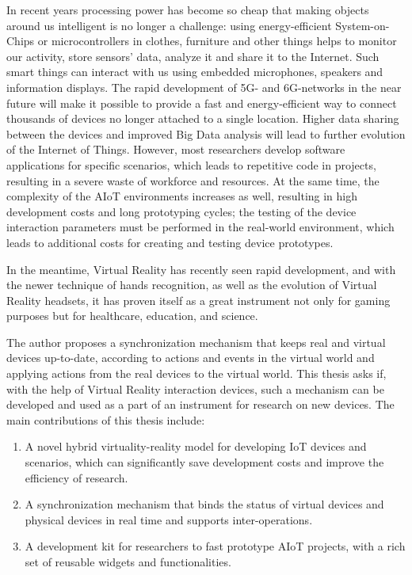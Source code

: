 \begin{abstract*}

  In recent years processing power has become so cheap that making objects around us intelligent is no longer a challenge: using energy-efficient System-on-Chips or microcontrollers in clothes, furniture and other things helps to monitor our activity, store sensors' data, analyze it and share it to the Internet. Such smart things can interact with us using embedded microphones, speakers and information displays. The rapid development of 5G- and 6G-networks in the near future will make it possible to provide a fast and energy-efficient way to connect thousands of devices no longer attached to a single location. Higher data sharing between the devices and improved Big Data analysis will lead to further evolution of the Internet of Things. However, most researchers develop software applications for specific scenarios, which leads to repetitive code in projects, resulting in a severe waste of workforce and resources. At the same time, the complexity of the AIoT environments increases as well, resulting in high development costs and long prototyping cycles; the testing of the device interaction parameters must be performed in the real-world environment, which leads to additional costs for creating and testing device prototypes.  
   
  In the meantime, Virtual Reality has recently seen rapid development, and with the newer technique of hands recognition, as well as the evolution of Virtual Reality headsets, it has proven itself as a great instrument not only for gaming purposes but for healthcare, education, and science.
   
  The author proposes a synchronization mechanism that keeps real and virtual devices up-to-date, according to actions and events in the virtual world and applying actions from the real devices to the virtual world. This thesis asks if, with the help of Virtual Reality interaction devices, such a mechanism can be developed and used as a part of an instrument for research on new devices. The main contributions of this thesis include:
  
  \begin{enumerate}
      \item A novel hybrid virtuality-reality model for developing IoT devices and scenarios, which can significantly save development costs and improve the efficiency of research. 
      \item A synchronization mechanism that binds the status of virtual devices and physical devices in real time and supports inter-operations. 
      \item A development kit for researchers to fast prototype AIoT projects, with a rich set of reusable widgets and functionalities.
  \end{enumerate}
  
\end{abstract*}
